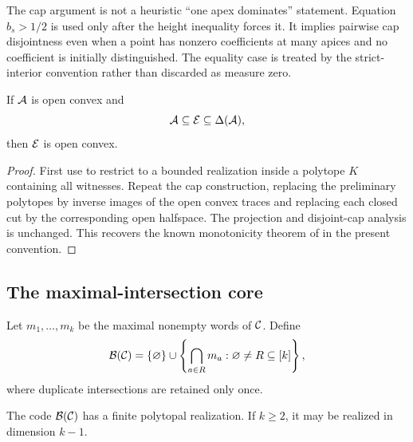 \begin{remark}
The cap argument is not a heuristic ``one apex dominates'' statement.  Equation $b_s>1/2$ is used only after the height inequality forces it.  It implies pairwise cap disjointness even when a point has nonzero coefficients at many apices and no coefficient is initially distinguished.  The equality case is treated by the strict-interior convention rather than discarded as measure zero.
\end{remark}

\begin{corollary}
\label{cor:open-monotonicity}
If $\mathcal A$ is open convex and
\[
 \mathcal A\subseteq\mathcal E\subseteq\Delta(\mathcal A),
\]
then $\mathcal E$ is open convex.
\end{corollary}

\begin{proof}
First use  to restrict to a bounded realization inside a polytope $K$ containing all witnesses.  Repeat the cap construction, replacing the preliminary polytopes by inverse images of the open convex traces and replacing each closed cut by the corresponding open halfspace.  The projection and disjoint-cap analysis is unchanged.  This recovers the known monotonicity theorem of \citet{CruzEtAl2019} in the present convention.
\end{proof}

\subsection{The maximal-intersection core}

Let $m_1,\ldots,m_k$ be the maximal nonempty words of $\mathcal C$.  Define
\[
 \mathcal B(\mathcal C)
 =\{\varnothing\}\cup
 \left\{\bigcap_{a\in R}m_a:
 \varnothing\ne R\subseteq[k]\right\},
\]
where duplicate intersections are retained only once.

\begin{proposition}
\label{prop:core-realization}
The code $\mathcal B(\mathcal C)$ has a finite polytopal realization.  If $k\ge2$, it may be realized in dimension $k-1$.
\end{proposition}

